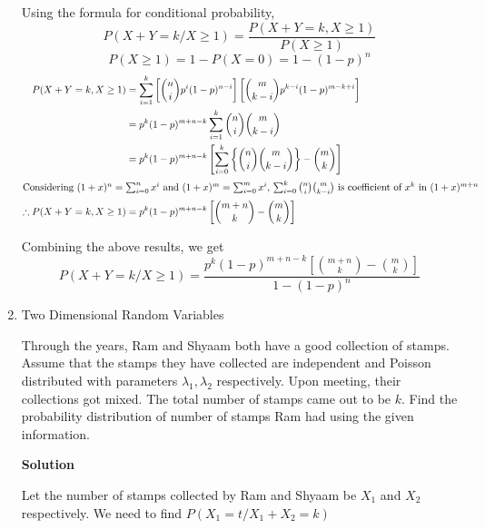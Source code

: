 \documentclass[12pt, oneside]{article}
\begin{document}
\begin{enumerate}
{    Using the formula for conditional probability,
    \[
        P(X + Y = k / X \geq 1) = \frac{P(X + Y = k, X \geq 1)}{P(X \geq 1)}
    \]
    \[P(X \geq 1) = 1 - P(X = 0) = 1 - (1 - p)^n\]
    \begin{align*}
        P(X + Y = k, X \geq 1) &= \sum_{i=1}^{k}
                            \left[{n \choose i}p^i(1-p)^{n - i}\right]
                            \left[{m \choose {k - i}}p^{k - i}(1-p)^{m - k + i}\right] \\
            &= p^k (1 - p)^{m + n - k}\sum_{i=1}^{k}{n \choose i}{m \choose {k - i}} \\
            &= p^k (1 - p)^{m + n - k}\left[\sum_{i=0}^{k}\left\{{n \choose i}{m \choose {k - i}}\right\}
                                      - {m \choose k} \right] \\
    \intertext{Considering \((1 + x)^n = \sum_{i=0}^{n}x^i\) and \((1 + x)^m = \sum_{i=0}^{m}x^i\),
        \(\sum_{i=0}^{k}{n \choose i}{m \choose {k - i}}\) is coefficient of \(x^k\) in \((1 + x)^{m + n}\)}
    \therefore P(X + Y = k, X \geq 1) &= p^k (1 - p)^{m + n - k}\left[{{m + n} \choose k} - {m \choose k}\right]
    \end{align*}

    Combining the above results, we get
    \[P(X + Y = k / X \geq 1) = \frac{p^k (1 - p)^{m + n - k}\left[{{m + n} \choose k} - {m \choose k}\right]}
                                     {1 - (1 - p)^n}\]
}

\item {
    Two Dimensional Random Variables

    Through the years, Ram and Shyaam both have a good collection of stamps. Assume that the
    stamps they have collected are independent and Poisson distributed with parameters \(\lambda_1, \lambda_2\)
    respectively. Upon meeting, their collections got mixed. The total number of stamps came
    out to be \(k\). Find the probability distribution of number of stamps Ram had using the
    given information.

    \textbf{Solution}

    Let the number of stamps collected by Ram and Shyaam be \(X_1\) and \(X_2\) respectively.
    We need to find \(P(X_1 = t / X_1 + X_2 = k)\)

}
\end{enumerate}
\end{document}
